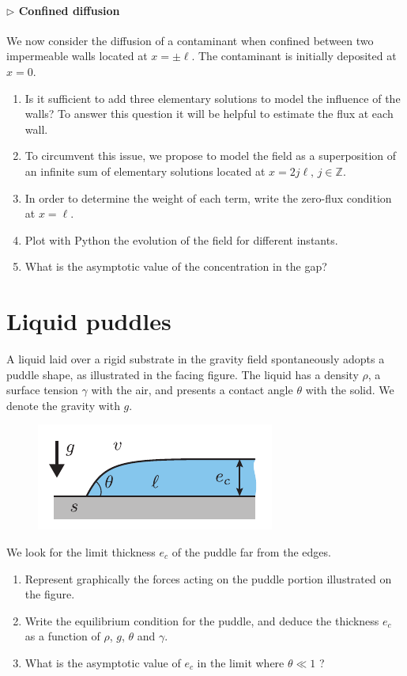 \documentclass[11pt,a4paper]{article}
\begin{document}
\paragraph{$\rhd$ Confined diffusion}
We now consider the diffusion of a contaminant when confined between two impermeable walls located at $x=\pm \ell$. The contaminant is initially deposited at $x=0$.
\begin{enumerate}[resume]
\item Is it sufficient to add three elementary solutions to model the influence of the walls? To answer this question it will be helpful to estimate the flux at each wall.
\item To circumvent this issue, we propose to model the field as a superposition of an infinite sum of elementary solutions located at $x = 2 j \ell, \, j\in \mathbb{Z}$.
\item In order to determine the weight of each term, write the zero-flux condition at $x = \ell$.
\item Plot with Python the evolution of the field for different instants.
\item What is the asymptotic value of the concentration in the gap?
\end{enumerate}
\section{Liquid puddles}
 \noindent A liquid laid over a rigid substrate in the gravity field spontaneously adopts a puddle shape, as illustrated in the facing figure. The liquid has a density $\rho$, a surface tension $\gamma$ with the air, and presents a contact angle $\theta$ with the solid. We denote the gravity with $g$. 
\begin{figure}
\centering
\includegraphics{flaque.pdf}
\end{figure}

\noindent We look for the limit thickness $e_c$ of the puddle far from the edges.
\begin{enumerate}
\item Represent graphically the forces acting on the puddle portion illustrated on the figure.
\item Write the equilibrium condition for the puddle, and deduce the thickness $e_c$ as a function of $\rho$, $g$, $\theta$ and $\gamma$. 
\item What is the asymptotic value of $e_c$ in the limit where $\theta \ll 1$ ?
\end{enumerate}
~
\end{document}
